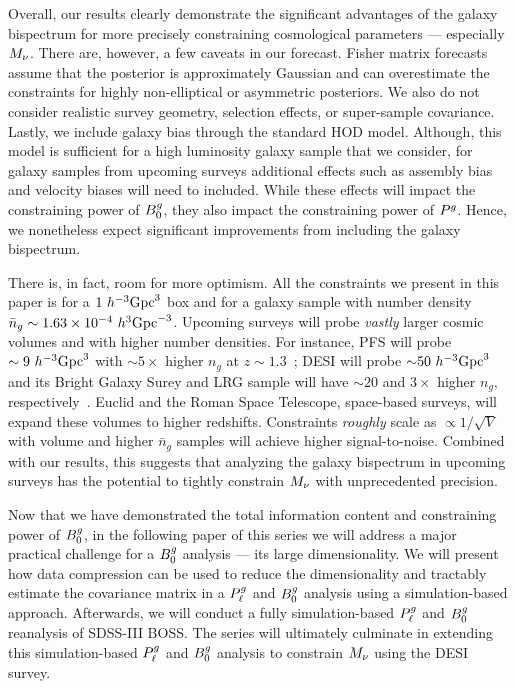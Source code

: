 Overall, our results clearly demonstrate the significant advantages of the
galaxy bispectrum for more precisely constraining cosmological parameters ---
especially $M_\nu$. There are, however, a few caveats in our forecast. 
Fisher matrix forecasts assume that the posterior is approximately Gaussian and
can overestimate the constraints for highly non-elliptical or asymmetric
posteriors. We also do not consider realistic survey geometry, selection
effects, or super-sample covariance. Lastly, we include galaxy bias through the
standard \cite{zheng2007} HOD model. Although, this model is sufficient for 
a high luminosity galaxy sample that we consider, for galaxy samples from 
upcoming surveys additional effects such as assembly bias and
velocity biases will need to included. While these effects will impact the
constraining power of $B^g_0$, they also impact the constraining power of
$P^g$. Hence, we nonetheless expect significant improvements from including 
the galaxy bispectrum.

There is, in fact, room for more optimism. All the constraints we present in
this paper is for a $1~h^{-3}{\rm Gpc}^3$ box and for a galaxy sample with number
density $\bar{n}_g \sim 1.63\times 10^{-4}~h^3{\rm Gpc}^{-3}$. Upcoming surveys
will probe {\em vastly} larger cosmic volumes and with higher number densities.
For instance, PFS will probe $\sim 9~h^{-3}{\rm Gpc}^3$ with ${\sim}5\times$
higher $n_g$ at $z{\sim}1.3$~\citep{takada2014}; DESI will probe ${\sim}50~h^{-3}{\rm Gpc}^3$
and its Bright Galaxy Surey and LRG sample will have ${\sim}20$ and $3\times$ 
higher $n_g$, respectively~\citep{desicollaboration2016,ruiz-macias2020}. 
Euclid and the Roman Space Telescope, space-based surveys, will expand these 
volumes to higher redshifts. Constraints {\em roughly} scale as $\propto 1/\sqrt{V}$
with volume and higher $\bar{n}_g$ samples will achieve higher signal-to-noise. 
Combined with our results, this suggests that analyzing the galaxy bispectrum in 
upcoming surveys has the potential to tightly constrain $M_\nu$ with unprecedented 
precision. 

Now that we have demonstrated the total information content and constraining
power of $B^g_0$, in the following paper of this series we will address a major 
practical challenge for a $B^g_0$ analysis --- its 
large dimensionality. We will present how data compression can be used to reduce 
the dimensionality and tractably estimate the covariance matrix in a $P^g_{\ell}$ and
$B^g_0$ analysis using a simulation-based approach. Afterwards, we will conduct a 
fully simulation-based $P^g_{\ell}$ and $B^g_0$ reanalysis of SDSS-III BOSS. The series
will ultimately culminate in extending this simulation-based $P^g_{\ell}$ and $B^g_0$
analysis to constrain $M_\nu$ using the DESI survey. 
